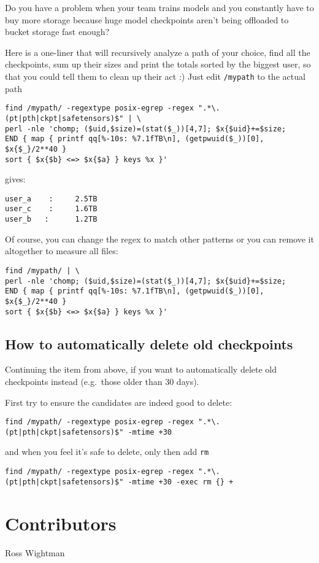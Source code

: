 \documentclass[
]{report}
\begin{document}
Do you have a problem when your team trains models and you constantly
have to buy more storage because huge model checkpoints aren't being
offloaded to bucket storage fast enough?

Here is a one-liner that will recursively analyze a path of your choice,
find all the checkpoints, sum up their sizes and print the totals sorted
by the biggest user, so that you could tell them to clean up their act
:) Just edit \texttt{/mypath} to the actual path

\begin{verbatim}
find /mypath/ -regextype posix-egrep -regex ".*\.(pt|pth|ckpt|safetensors)$" | \
perl -nle 'chomp; ($uid,$size)=(stat($_))[4,7]; $x{$uid}+=$size;
END { map { printf qq[%-10s: %7.1fTB\n], (getpwuid($_))[0], $x{$_}/2**40 }
sort { $x{$b} <=> $x{$a} } keys %x }'
\end{verbatim}

gives:

\begin{verbatim}
user_a    :     2.5TB
user_c    :     1.6TB
user_b   :      1.2TB
\end{verbatim}

Of course, you can change the regex to match other patterns or you can
remove it altogether to measure all files:

\begin{verbatim}
find /mypath/ | \
perl -nle 'chomp; ($uid,$size)=(stat($_))[4,7]; $x{$uid}+=$size;
END { map { printf qq[%-10s: %7.1fTB\n], (getpwuid($_))[0], $x{$_}/2**40 }
sort { $x{$b} <=> $x{$a} } keys %x }'
\end{verbatim}

\subsection{How to automatically delete old
checkpoints}\label{how-to-automatically-delete-old-checkpoints}

Continuing the item from above, if you want to automatically delete old
checkpoints instead (e.g.~those older than 30 days).

First try to ensure the candidates are indeed good to delete:

\begin{verbatim}
find /mypath/ -regextype posix-egrep -regex ".*\.(pt|pth|ckpt|safetensors)$" -mtime +30
\end{verbatim}

and when you feel it's safe to delete, only then add \texttt{rm}

\begin{verbatim}
find /mypath/ -regextype posix-egrep -regex ".*\.(pt|pth|ckpt|safetensors)$" -mtime +30 -exec rm {} +
\end{verbatim}

\section{Contributors}\label{contributors}

Ross Wightman
\end{document}
